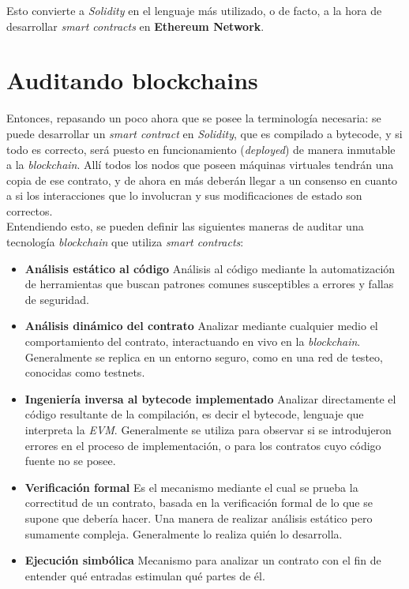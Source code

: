 Esto convierte a \textit{Solidity} en el lenguaje más utilizado, o de facto, a la hora de desarrollar \textit{smart contracts} en \textbf{Ethereum Network}\cite{ethereumhowlink}.

\section{Auditando blockchains}
\label{sect:marco:auditblock}
Entonces, repasando un poco ahora que se posee la terminología necesaria: se puede desarrollar un \textit{smart contract} en \textit{Solidity}, que es compilado a bytecode, y si todo es correcto, será puesto en funcionamiento (\textit{deployed}) de manera inmutable a la \textit{blockchain}. Allí todos los nodos que poseen máquinas virtuales tendrán una copia de ese contrato, y de ahora en más deberán llegar a un consenso en cuanto a si los interacciones que lo involucran y sus modificaciones de estado son correctos.\\

Entendiendo esto, se pueden definir las siguientes maneras de auditar una tecnología \textit{blockchain} que utiliza \textit{smart contracts}:
\begin{itemize}
    \item \textbf{Análisis estático al código}\newline
    Análisis al código mediante la automatización de herramientas que buscan patrones comunes susceptibles a errores y fallas de seguridad.
    \item \textbf{Análisis dinámico del contrato}\newline
    Analizar mediante cualquier medio el comportamiento del contrato, interactuando en vivo en la \textit{blockchain}. Generalmente se replica en un entorno seguro, como en una red de testeo, conocidas como testnets.
    \item \textbf{Ingeniería inversa al bytecode implementado}\newline
    Analizar directamente el código resultante de la compilación, es decir el bytecode, lenguaje que interpreta la \textit{EVM}. Generalmente se utiliza para observar si se introdujeron errores en el proceso de implementación, o para los contratos cuyo código fuente no se posee.
    \item \textbf{Verificación formal}\newline
    Es el mecanismo mediante el cual se prueba la correctitud de un contrato, basada en la verificación formal de lo que se supone que debería hacer. Una manera de realizar análisis estático pero sumamente compleja. Generalmente lo realiza quién lo desarrolla.
    \item \textbf{Ejecución simbólica}\newline
    Mecanismo para analizar un contrato con el fin de entender qué entradas estimulan qué partes de él.
\end{itemize}

